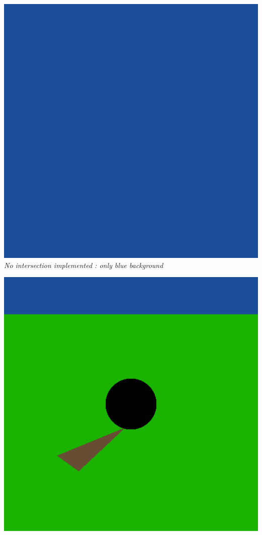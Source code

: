 \documentclass[a4,12pt]{article}
\begin{document}
	\begin{center}
	\begin{minipage}[b]{0.40\linewidth}
		\begin{center}
			\includegraphics[width =\textwidth]{./Worksheet1/blue_closest_hit.png}\\
			\textit{No intersection implemented : only blue background}
		\end{center}
	\end{minipage}
	\hspace{0.05\linewidth}
	\begin{minipage}[b]{0.40\linewidth}
		\begin{center}
			\includegraphics[width =\textwidth]{./Worksheet1/intersection.png}\\

\end{center}
\end{minipage}
\end{center}
\end{document}
